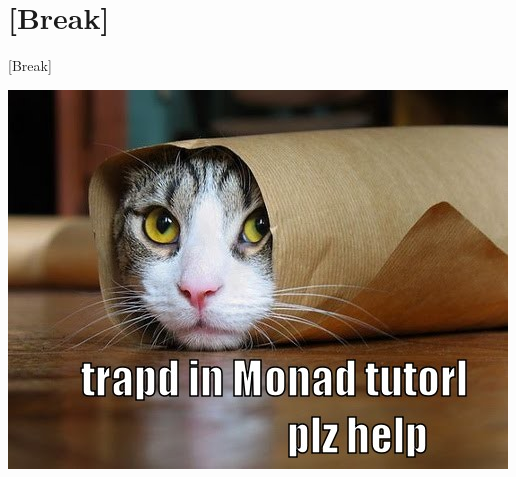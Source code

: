\documentclass[utf8x,notes,17pt]{beamer}
\begin{document}
\section{[Break]}
\label{sec-14}
\begin{frame}[fragile,label=sec-14-1]{[Break]}
\begin{center}
\includegraphics[width=.9\linewidth]{images/monad-tutorial.jpg}
\end{center}
\end{frame}
\end{document}
